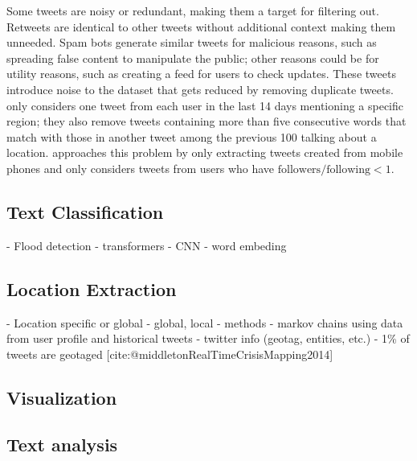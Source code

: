 Some tweets are noisy or redundant, making them a target for filtering out. Retweets are identical
to other tweets without additional context making them unneeded. Spam bots generate similar tweets
for malicious reasons, such as spreading false content to manipulate the public; other reasons could
be for utility reasons, such as creating a feed for users to check updates. These tweets introduce
noise to the dataset that gets reduced by removing duplicate tweets.
 only considers one tweet from each user in the last
14 days mentioning a specific region; they also remove tweets containing more than five consecutive
words that match with those in another tweet among the previous 100 talking about a location.
 approaches this problem by only extracting tweets
created from mobile phones and only considers tweets from users who have $\text{followers} /
\text{following} < 1$.

\subsection{Text Classification}
- Flood detection
  - transformers
  - CNN
  - word embeding
\subsection{Location Extraction}
- Location specific or global
  - global, local
  - methods
    - markov chains using data from user profile and historical tweets
  - twitter info (geotag, entities, etc.)
  - 1\% of tweets are geotaged    [cite:@middletonRealTimeCrisisMapping2014]
\subsection{Visualization}

\subsection{Text analysis}
